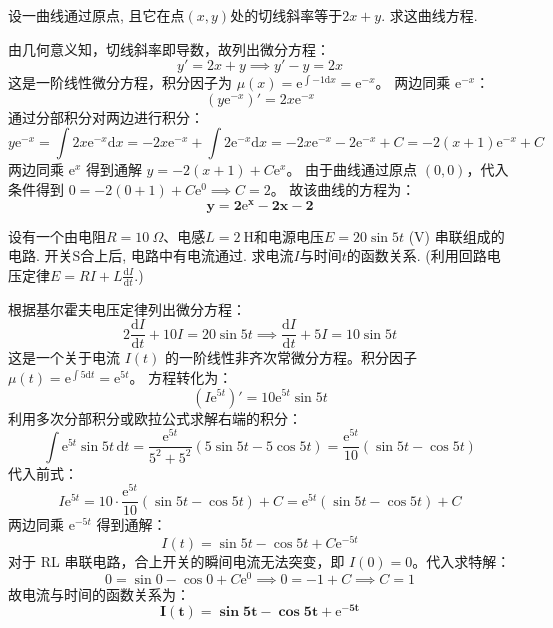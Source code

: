 \documentclass[lang=cn,11pt]{elegantbook}
\begin{document}
\begin{exercise}[求曲线方程]
设一曲线通过原点, 且它在点$(x,y)$处的切线斜率等于$2x+y$. 求这曲线方程.
\end{exercise}
\begin{solution}
由几何意义知，切线斜率即导数，故列出微分方程：
\[
y' = 2x + y \implies y' - y = 2x
\]
这是一阶线性微分方程，积分因子为 $\mu(x) = \mathrm{e}^{\int -1\mathrm{d}x} = \mathrm{e}^{-x}$。
两边同乘 $\mathrm{e}^{-x}$：
\[
(y\mathrm{e}^{-x})' = 2x\mathrm{e}^{-x}
\]
通过分部积分对两边进行积分：
\[
y\mathrm{e}^{-x} = \int 2x\mathrm{e}^{-x}\mathrm{d}x = -2x\mathrm{e}^{-x} + \int 2\mathrm{e}^{-x}\mathrm{d}x = -2x\mathrm{e}^{-x} - 2\mathrm{e}^{-x} + C = -2(x+1)\mathrm{e}^{-x} + C
\]
两边同乘 $\mathrm{e}^x$ 得到通解 $y = -2(x+1) + C\mathrm{e}^x$。
由于曲线通过原点 $(0,0)$，代入条件得到 $0 = -2(0+1) + C\mathrm{e}^0 \implies C = 2$。
故该曲线的方程为：
\[
\mathbf{y = 2\mathrm{e}^x - 2x - 2}
\]
\end{solution}

\begin{exercise}
设有一个由电阻$R=10\ \Omega$、电感$L=2\ \mathrm{H}$和电源电压$E=20\sin5t$ (V) 串联组成的电路. 开关$\mathrm{S}$合上后, 电路中有电流通过. 求电流$I$与时间$t$的函数关系. (利用回路电压定律$\displaystyle E=RI+L\frac{\mathrm{d}I}{\mathrm{d}t}$.)
\end{exercise}
\begin{solution}
根据基尔霍夫电压定律列出微分方程：
\[
2\frac{\mathrm{d}I}{\mathrm{d}t} + 10I = 20\sin 5t \implies \frac{\mathrm{d}I}{\mathrm{d}t} + 5I = 10\sin 5t
\]
这是一个关于电流 $I(t)$ 的一阶线性非齐次常微分方程。积分因子 $\mu(t) = \mathrm{e}^{\int 5\mathrm{d}t} = \mathrm{e}^{5t}$。
方程转化为：
\[
(I\mathrm{e}^{5t})' = 10\mathrm{e}^{5t}\sin 5t
\]
利用多次分部积分或欧拉公式求解右端的积分：
\[
\int \mathrm{e}^{5t}\sin 5t\,\mathrm{d}t = \frac{\mathrm{e}^{5t}}{5^2 + 5^2}(5\sin 5t - 5\cos 5t) = \frac{\mathrm{e}^{5t}}{10}(\sin 5t - \cos 5t)
\]
代入前式：
\[
I\mathrm{e}^{5t} = 10 \cdot \frac{\mathrm{e}^{5t}}{10}(\sin 5t - \cos 5t) + C = \mathrm{e}^{5t}(\sin 5t - \cos 5t) + C
\]
两边同乘 $\mathrm{e}^{-5t}$ 得到通解：
\[
I(t) = \sin 5t - \cos 5t + C\mathrm{e}^{-5t}
\]
对于 RL 串联电路，合上开关的瞬间电流无法突变，即 $I(0) = 0$。代入求特解：
\[
0 = \sin 0 - \cos 0 + C\mathrm{e}^0 \implies 0 = -1 + C \implies C = 1
\]
故电流与时间的函数关系为：
\[
\mathbf{I(t) = \sin 5t - \cos 5t + \mathrm{e}^{-5t}}
\]
\end{solution}
\end{document}
